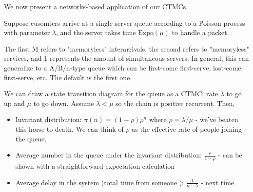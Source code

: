 We now present a networks-based application of our CTMCs.

\begin{example}[M/M/1 Queue]
    Suppose cusomters arrive at a single-server queue according to a Poisson process with parameter $\lambda$,
    and the server takes time $\text{Expo}(\mu)$ to handle a packet. 
    
    The first M refers to "memoryless" interarrivals, the second
    refers to "memoryless" services, and 1 represents the amount of simultaneous servers. In general, this can generalize to a
    A/B/n-type queue which can be first-come first-serve, last-come first-serve, etc. The default is the first one.

    We can draw a state transition diagram for the queue as a CTMC; rate $\lambda$ to go up and $\mu$ to go down.
    Assume $\lambda < \mu$ so the chain is positive recurrent. Then,
    \begin{itemize}
        \item Invariant distribution: $\pi(n) = (1 - \rho) \rho^n$ where $\rho = \lambda / \mu$ - we've beaten this horse to death. We can think of $\rho$ as the effective rate of people joining the queue.
        \item Average number in the queue under the invariant distribution: $\frac{\rho}{1 - \rho}$ - can be shown with a straightforward expectation calculation
        \item Average delay in the system (total time from someone ): $\frac{1}{\mu - \lambda}$ - next time
    \end{itemize}
\end{example}
